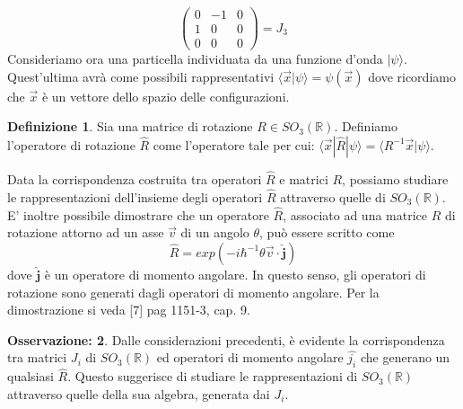 \documentclass[12pt,a4paper]{report}
\theoremstyle{definition}
\newtheorem{Def}{Definizione}[chapter]
\theoremstyle{Theorem}
\theoremstyle{definition}
\theoremstyle{definition}
\theoremstyle{definition}
\newtheorem{Obs}[Def]{Osservazione:}
\begin{document}
$$
\begin{pmatrix}
	0 &-1&0\\
	1 &0&0\\
	0 &0&0
\end{pmatrix}= J_3$$
Consideriamo ora una particella individuata da una funzione d'onda $|\psi\rangle$. Quest'ultima avrà come possibili rappresentativi $\langle \vec{x}|\psi\rangle=\psi(\vec{x})$ dove ricordiamo che $\vec{x}$ è un vettore dello spazio delle configurazioni.
\begin{Def}
	Sia una matrice di rotazione $R\in SO_3(\mathbb{R})$. Definiamo l'operatore di rotazione $\hat{R}$ come l'operatore tale per cui:
	$\langle\vec{x}|\hat{R}|\psi\rangle=\langle R^{-1}\vec{x}|\psi\rangle$.
\end{Def}
Data la corrispondenza costruita tra operatori $\hat{R}$ e matrici $R$, possiamo studiare le rappresentazioni dell'insieme degli operatori $\hat{R}$ attraverso quelle di $SO_3(\mathbb{R})$. E' inoltre possibile dimostrare che un operatore $\hat{R}$, associato ad una matrice $R$ di rotazione attorno ad un asse $\vec{v}$ di un angolo $\theta$, può essere scritto come 
$$\hat{R}=exp(-i\hbar^{-1}\theta\vec{v}\cdot\hat{\textbf{j}})$$
dove $\hat{\textbf{j}}$ è un operatore di momento angolare. In questo senso, gli operatori di rotazione sono generati dagli operatori di momento angolare. Per la dimostrazione si veda [7] pag 1151-3, cap. 9.
\begin{Obs}
	Dalle considerazioni precedenti, è evidente la corrispondenza tra matrici $J_i$ di $SO_3(\mathbb{R})$ ed operatori di momento angolare $\hat{j_i}$ che generano un qualsiasi $\hat{R}$.
	Questo suggerisce di studiare le rappresentazioni di $SO_3(\mathbb{R})$ attraverso quelle della sua algebra, generata dai $J_i$.
\end{Obs}
\end{document}
